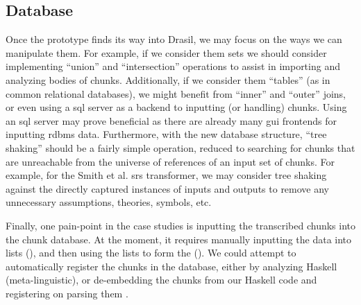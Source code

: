 \subsection{Database}
\label{chap:futureWork:sec:chunks:sub:database}

Once the \ChunkDB{} prototype finds its way into Drasil, we may focus on the
ways we can manipulate them. For example, if we consider them sets we should
consider implementing ``union'' and ``intersection'' operations to assist in
importing and analyzing bodies of chunks. Additionally, if we consider them
``tables'' (as in common relational databases), we might benefit from ``inner''
and ``outer'' joins, or even using a \acs{sql} server as a backend to inputting
(or handling) chunks. Using an \acs{sql} server may prove beneficial as there
are already many \acs{gui} frontends for inputting \acs{rdbms} data.
Furthermore, with the new database structure, ``tree shaking'' should be a
fairly simple operation, reduced to searching for chunks that are unreachable
from the universe of references of an input set of chunks. For example, for the
Smith et al. \acs{srs} transformer, we may consider tree shaking against the
directly captured instances of inputs and outputs to remove any unnecessary
assumptions, theories, symbols, etc.

Finally, one pain-point in the case studies is inputting the transcribed chunks
into the chunk database. At the moment, it requires manually inputting the data
into lists (), and then using the
lists to form the \ChunkDB{}
(). We could attempt to
automatically register the chunks in the database, either by analyzing Haskell
(meta-linguistic), or de-embedding the chunks from our Haskell code and
registering on parsing them \cite{DrasilIssue2873ChunkDBCaretteResponse}. 
